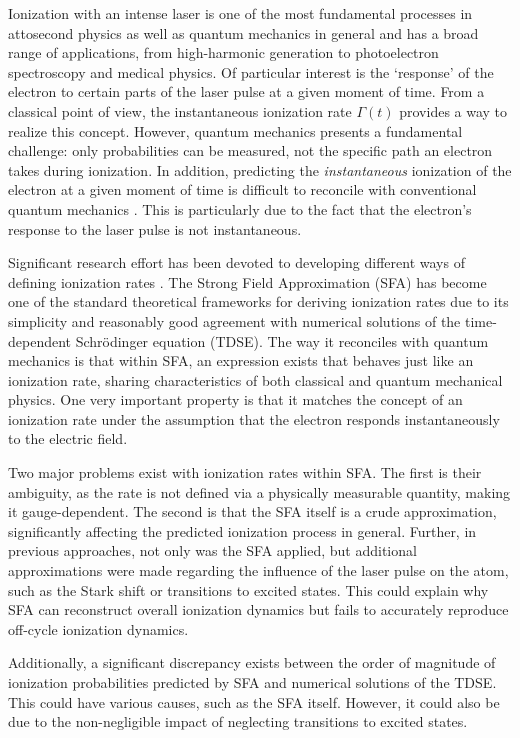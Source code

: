 Ionization with an intense laser is one of the most fundamental processes in attosecond physics as well as quantum mechanics in general and has a broad range of applications, from high-harmonic generation to photoelectron spectroscopy and medical physics.
Of particular interest is the `response' of the electron to certain parts of the laser pulse at a given moment of time.
From a classical point of view, the instantaneous ionization rate $\Gamma(t)$ provides a way to realize this concept.
However, quantum mechanics presents a fundamental challenge: only probabilities can be measured, not the specific path an electron takes during ionization.
In addition, predicting the \emph{instantaneous} ionization of the electron at a given moment of time is difficult to reconcile with conventional quantum mechanics \cite{Ivanov2018}.
This is particularly due to the fact that the electron's response to the laser pulse is not instantaneous.

\medskip
Significant research effort has been devoted to developing different ways of defining ionization rates \cite{agarwal2025generalapproximatorstrongfieldionization,Ivanov2018}.
The Strong Field Approximation (SFA) has become one of the standard theoretical frameworks for deriving ionization rates due to its simplicity and reasonably good agreement with numerical solutions of the time-dependent Schrödinger equation (TDSE).
The way it reconciles with quantum mechanics is that within SFA, an expression exists that behaves just like an ionization rate, sharing characteristics of both classical and quantum mechanical physics.
One very important property is that it matches the concept of an ionization rate under the assumption that the electron responds instantaneously to the electric field.

\medskip
Two major problems exist with ionization rates within SFA.
The first is their ambiguity, as the rate is not defined via a physically measurable quantity, making it gauge-dependent.
The second is that the SFA itself is a crude approximation, significantly affecting the predicted ionization process in general.
Further, in previous approaches, not only was the SFA applied, but additional approximations were made regarding the influence of the laser pulse on the atom, such as the Stark shift or transitions to excited states.
This could explain why SFA can reconstruct overall ionization dynamics but fails to accurately reproduce off-cycle ionization dynamics.

\medskip
Additionally, a significant discrepancy exists between the order of magnitude of ionization probabilities predicted by SFA and numerical solutions of the TDSE.
This could have various causes, such as the SFA itself.
However, it could also be due to the non-negligible impact of neglecting transitions to excited states.

